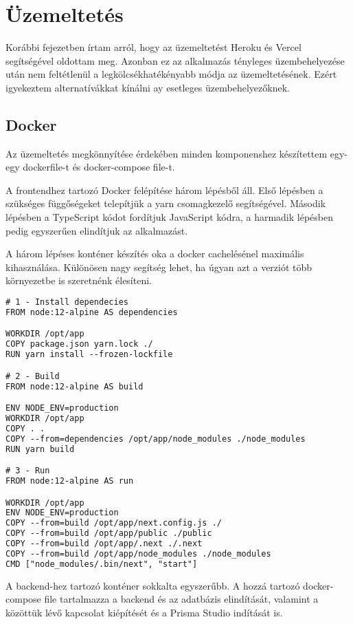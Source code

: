 \chapter{Üzemeltetés}
Korábbi fejezetben írtam arról, hogy az üzemeltetést Heroku és Vercel segítségével oldottam meg.
Azonban ez az alkalmazás tényleges üzembehelyezése után nem feltétlenül a legkölcsékhatékényabb módja az üzemeltetésének.
Ezért igyekeztem alternatívákkat kínálni ay esetleges üzembehelyezőknek.

\section{Docker}
Az üzemeltetés megkönnyítése érdekében minden komponenshez készítettem egy-egy dockerfile-t és docker-compose file-t.

A frontendhez tartozó Docker felépítése három lépésből áll. Első lépésben a szükséges függőségeket telepítjük a yarn csomagkezelő segítségével.
Második lépésben a TypeScript kódot fordítjuk JavaScript kódra, a harmadik lépésben pedig egyszerűen elindítjuk az alkalmazást.

A három lépéses konténer készítés oka a docker cachelésénel maximális kihasználása.
Különösen nagy segítség lehet, ha úgyan azt a verziót több környezetbe is szeretnénk élesíteni.

\begin{lstlisting}[language=TeX, caption=Frontend Dockerfile]
# 1 - Install dependecies
FROM node:12-alpine AS dependencies

WORKDIR /opt/app
COPY package.json yarn.lock ./
RUN yarn install --frozen-lockfile

# 2 - Build
FROM node:12-alpine AS build

ENV NODE_ENV=production
WORKDIR /opt/app
COPY . .
COPY --from=dependencies /opt/app/node_modules ./node_modules
RUN yarn build

# 3 - Run
FROM node:12-alpine AS run

WORKDIR /opt/app
ENV NODE_ENV=production
COPY --from=build /opt/app/next.config.js ./
COPY --from=build /opt/app/public ./public
COPY --from=build /opt/app/.next ./.next
COPY --from=build /opt/app/node_modules ./node_modules
CMD ["node_modules/.bin/next", "start"]
\end{lstlisting}

A backend-hez tartozó konténer sokkalta egyszerűbb. 
A hozzá tartozó docker-compose file tartalmazza a backend és az adatbázis elindítását, valamint a közöttük lévő kapcsolat kiépítését és a Prisma Studio indítását is.


